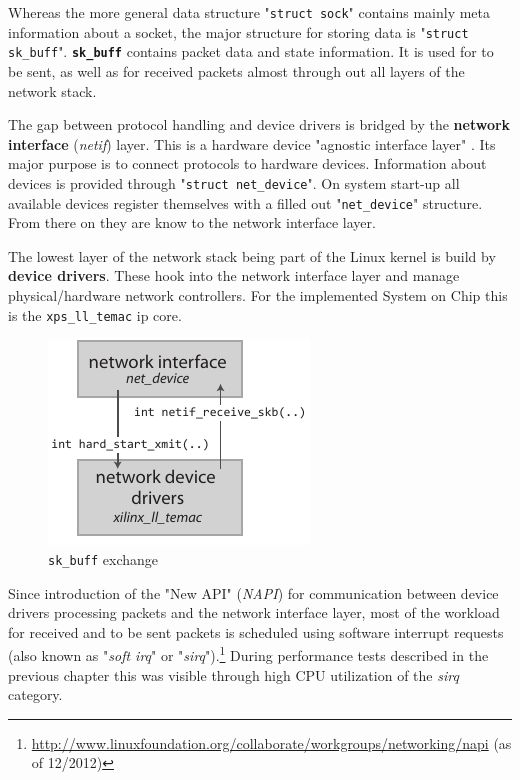 Whereas the more general data structure "\texttt{struct sock}" contains mainly meta information about a socket, the major structure for storing data is "\texttt{struct sk\_buff}". \textbf{\texttt{sk\_buff}} contains packet data and state information. It is used for to be sent, as well as for received packets almost through out all layers of the network stack. \cite{netstackana}

The gap between protocol handling and device drivers is bridged by the \textbf{network interface} (\textit{netif}) layer. This is a hardware device "agnostic interface layer" \cite{netstackana}. Its major purpose is to connect protocols to hardware devices. Information about devices is provided through "\texttt{struct net\_device}". On system start-up all available devices register themselves with a filled out "\texttt{net\_device}" structure. From there on they are know to the network interface layer.

The lowest layer of the network stack being part of the Linux kernel is build by \textbf{device drivers}. These hook into the network interface layer and manage physical/hardware network controllers. For the implemented System on Chip this is the \texttt{xps\_ll\_temac} \gls{ip} core.

\begin{figure}
	\centering
	\includegraphics[scale=1]{images/netif-dev.pdf}
	\caption{\texttt{sk\_buff} exchange}
	\label{fig:netif-dev}
\end{figure}

Since introduction of the "New API" (\textit{NAPI}) for communication between device drivers processing packets and the network interface layer, most of the workload for received and to be sent packets is scheduled using software interrupt requests (also known as "\textit{soft irq}" or "\textit{sirq}").\footnote{\url{http://www.linuxfoundation.org/collaborate/workgroups/networking/napi} (as of 12/2012)} During performance tests described in the previous chapter this was visible through high CPU utilization of the \textit{sirq} category.

